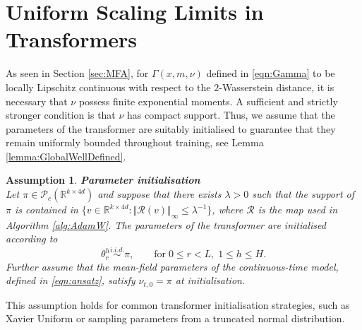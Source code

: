 \documentclass{article}
\newtheorem{assumption}{Assumption}
\newcommand{\R}{\mathbb{R}}
\begin{document}
\section{Uniform Scaling Limits in Transformers}
As seen in Section \ref{sec:MFA}, for $\Gamma(x,m,\nu)$ defined in \eqref{eqn:Gamma} to be locally Lipschitz continuous with respect to the $2$-Wasserstein distance, it is necessary that $\nu$ possess finite exponential moments. A sufficient and strictly stronger condition is that $\nu$ has compact support. Thus, we assume that the parameters of the transformer are suitably initialised to guarantee that they remain uniformly bounded throughout training, see Lemma \ref{lemma:GlobalWellDefined}.
\begin{assumption}\label{assm:Init}
\textbf{Parameter initialisation}\\
    Let $\pi \in \mathcal P_c(\R^{k\times 4d})$ and suppose that there exists $\lambda>0$ such that the support of $\pi$ is contained in $\{v \in \R^{k\times 4d}: \Vert \mathcal{R}(v) \Vert_\infty \le \lambda^{-1}\}$, where $\mathcal R$ is the map used in Algorithm \ref{alg:AdamW}. The parameters of the transformer are initialised according to
    \[
    \theta^h_r \overset{i.i.d.}{\sim} \pi, \qquad \text{for} \; 0 \le r < L,\;1\le h\le H.
    \]
    Further assume that the mean-field parameters of the continuous-time model, defined in \eqref{eqn:ansatz}, satisfy $\nu_{t,0}=\pi$ at initialisation.
\end{assumption}
This assumption holds for common transformer initialisation strategies, such as Xavier Uniform \cite{pmlr-v9-glorot10a} or sampling parameters from a truncated normal distribution. 
\end{document}

